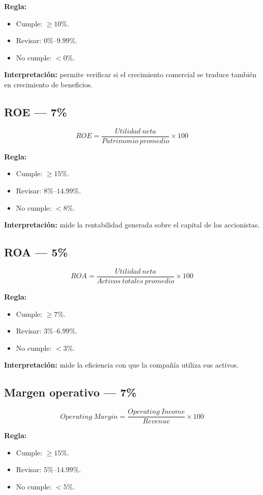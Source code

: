 \documentclass[11pt,a4paper]{article}
\begin{document}
\textbf{Regla:}
\begin{itemize}[leftmargin=*]
\item Cumple: $\geq10\%$.
\item Revisar: $0\%$--$9.99\%$.
\item No cumple: $<0\%$.
\end{itemize}

\textbf{Interpretación:} permite verificar si el crecimiento comercial se traduce también en crecimiento de beneficios.

\subsection{ROE --- 7\%}
\[
\boxed{
ROE=
\frac{Utilidad\ neta}{Patrimonio\ promedio}\times100
}
\]

\textbf{Regla:}
\begin{itemize}[leftmargin=*]
\item Cumple: $\geq15\%$.
\item Revisar: $8\%$--$14.99\%$.
\item No cumple: $<8\%$.
\end{itemize}

\textbf{Interpretación:} mide la rentabilidad generada sobre el capital de los accionistas.

\subsection{ROA --- 5\%}
\[
\boxed{
ROA=
\frac{Utilidad\ neta}{Activos\ totales\ promedio}\times100
}
\]

\textbf{Regla:}
\begin{itemize}[leftmargin=*]
\item Cumple: $\geq7\%$.
\item Revisar: $3\%$--$6.99\%$.
\item No cumple: $<3\%$.
\end{itemize}

\textbf{Interpretación:} mide la eficiencia con que la compañía utiliza sus activos.

\subsection{Margen operativo --- 7\%}
\[
\boxed{
Operating\ Margin=
\frac{Operating\ Income}{Revenue}\times100
}
\]

\textbf{Regla:}
\begin{itemize}[leftmargin=*]
\item Cumple: $\geq15\%$.
\item Revisar: $5\%$--$14.99\%$.
\item No cumple: $<5\%$.
\end{itemize}
\end{document}
